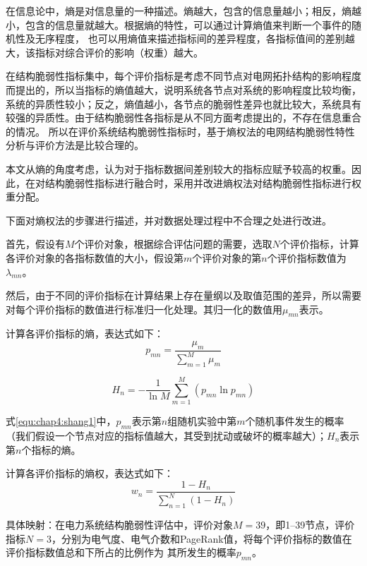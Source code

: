 在信息论中，熵是对信息量的一种描述。熵越大，包含的信息量越小；相反，熵越小，包含的信息量就越大。根据熵的特性，可以通过计算熵值来判断一个事件的随机性及无序程度，
也可以用熵值来描述指标间的差异程度，各指标值间的差别越大，该指标对综合评价的影响（权重）越大。

在结构脆弱性指标集中，每个评价指标是考虑不同节点对电网拓扑结构的影响程度而提出的，所以当指标的熵值越大，说明系统各节点对系统的影响程度比较均衡，
系统的异质性较小；反之，熵值越小，各节点的脆弱性差异也就比较大，系统具有较强的异质性。由于结构脆弱性各指标是从不同方面考虑提出的，不存在信息重合的情况。
所以在评价系统结构脆弱性指标时，基于熵权法的电网结构脆弱性特性分析与评价方法是比较合理的。

本文从熵的角度考虑，认为对于指标数据间差别较大的指标应赋予较高的权重。因此，在对结构脆弱性指标进行融合时，采用并改进熵权法对结构脆弱性指标进行权重分配。

下面对熵权法的步骤进行描述，并对数据处理过程中不合理之处进行改进。

首先，假设有$M$个评价对象，根据综合评估问题的需要，选取$N$个评价指标，计算各评价对象的各指标数值的大小，假设第$m$个评价对象的第$n$个评价指标数值为$\lambda_{mn}$。

然后，由于不同的评价指标在计算结果上存在量纲以及取值范围的差异，所以需要对每个评价指标的数值进行标准归一化处理。其归一化的数值用$\mu_{mn}$表示。

计算各评价指标的熵，表达式如下：
\begin{equation}
\label{equ:chap4:shang1}
  p_{m n}=\frac{\mu_{m}}{\sum_{m=1}^{M} \mu_{m}}
  \end{equation}

\begin{equation}
  H_{n}=-\frac{1}{\ln M} \sum_{m=1}^{M}\left(p_{m n} \ln p_{m n}\right)
  \end{equation}

式\ref{equ:chap4:shang1}中，$p_{mn}$表示第$n$组随机实验中第$m$个随机事件发生的概率（我们假设一个节点对应的指标值越大，其受到扰动或破坏的概率越大）；$H_n$表示第$n$个指标的熵。

计算各评价指标的熵权，表达式如下：
\begin{equation}
  w_{n}=\frac{1-H_{n}}{\sum_{n=1}^{N}\left(1-H_{n}\right)}
  \end{equation}

具体映射：在电力系统结构脆弱性评估中，评价对象$M=39$，即1--39节点，评价指标$N=3$，分别为电气度、电气介数和PageRank值，将每个评价指标的数值在评价指标数值总和下所占的比例作为
其所发生的概率$p_{mn}$。

